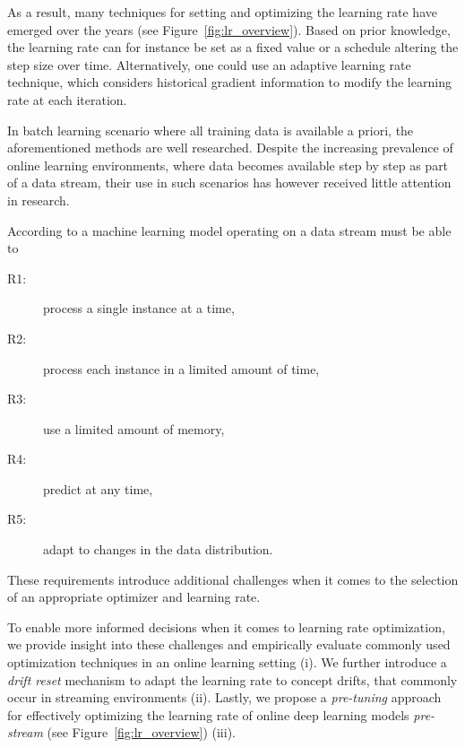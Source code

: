 \documentclass[runningheads]{llncs}
\begin{document}
As a result, many techniques for setting and optimizing the learning rate have emerged over the years (see Figure~\ref{fig:lr_overview}).
Based on prior knowledge, the learning rate can for instance be set as a fixed value or a schedule altering the step size over time.
Alternatively, one could use an adaptive learning rate technique, which considers historical gradient information to modify the learning rate at each iteration.

In batch learning scenario where all training data is available a priori, the aforementioned methods are well researched.
Despite the increasing prevalence of online learning environments, where data becomes available step by step as part of a data stream, their use in such scenarios has however received little attention in research.

According to \textcite{bifetMOAMassiveOnline2010} a machine learning model operating on a data stream must be able to
\begin{center}
	\begin{description}
		\item[R1:] process a single instance at a time,\label{rq:single_instance}
		\item[R2:] process each instance in a limited amount of time,\label{rq:limited_time}
		\item[R3:] use a limited amount of memory,\label{rq:limited_memory}
		\item[R4:] predict at any time,\label{rq:predict_any_time}
		\item[R5:] adapt to changes in the data distribution.\label{rq:adapt_to_drift}
	\end{description}
\end{center}

These requirements introduce additional challenges when it comes to the selection of an appropriate optimizer and learning rate.

To enable more informed decisions when it comes to learning rate optimization, we provide insight into these challenges and empirically evaluate commonly used optimization techniques in an online learning setting (i).
We further introduce a \textit{drift reset} mechanism to adapt the learning rate to concept drifts, that commonly occur in streaming environments (ii).
Lastly, we propose a \textit{pre-tuning} approach for effectively optimizing the learning rate of online deep learning models \textit{pre-stream} (see Figure~\ref{fig:lr_overview}) (iii).
\end{document}
